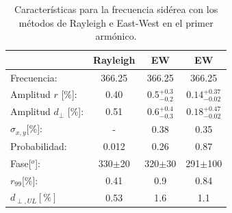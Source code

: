     \begin{table}[H]
        \begin{small}
            \begin{center}
                \begin{tabular}[c]{l|c||c|c}
                                            & Rayleigh    & EW                          & EW\cite{Aab_2020}      \\\hline
                    Frecuencia:             & 366.25	  & 366.25                      & 366.25        \\
                    Amplitud $r$ [\%]:      & 0.40	      & $0.5^{+0.3}_{-0.2}$         & $0.14^{+0.37}_{-0.02}$\cite{codigo}       \\
                    Amplitud $d_\perp$ [\%]:& 0.51        & $0.6^{+0.4}_{-0.3}$         & $0.18^{+0.47}_{-0.02}$       \\ 
                    $\sigma_{x,y}$[\%]:     & -	          & 0.38	                    & 0.35          \\
                    Probabilidad:           & 0.012	      & 0.26                        & 0.87          \\
                    Fase[$^o$]:             & 330$\pm$20  & 320$\pm$30                  & 291$\pm$100 \cite{discrepancia}      \\
                    $r_{99}$[\%]:           & 0.41	      & 0.9                         & 0.84\cite{codigo}        \\
                    $d_{\perp,UL}[\%]$      & 0.53        & 1.6                         & 1.1        \\
                \end{tabular}
            \end{center}
        \end{small}
        \caption{Características para la frecuencia sidérea con los métodos de Rayleigh  e East-West en el primer armónico.}
        \label{tab:siderea_3}
    \end{table}
   
